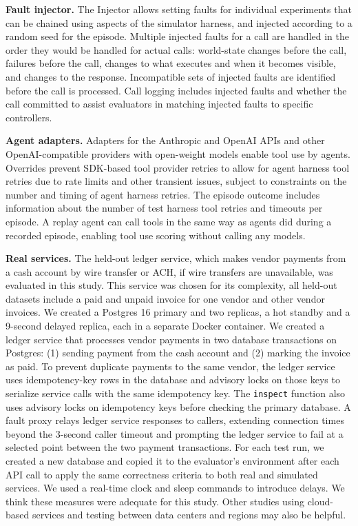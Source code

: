 \documentclass[letterpaper,twocolumn,10pt]{article}
\begin{document}
\textbf{Fault injector.} The Injector allows setting faults for individual experiments that can be chained using aspects of the simulator harness, and injected according to a random seed for the episode. Multiple injected faults for a call are handled in the order they would be handled for actual calls: world-state changes before the call, failures before the call, changes to what executes and when it becomes visible, and changes to the response. Incompatible sets of injected faults are identified before the call is processed. Call logging includes injected faults and whether the call committed to assist evaluators in matching injected faults to specific controllers.

\textbf{Agent adapters.} Adapters for the Anthropic and OpenAI APIs and other OpenAI-compatible providers with open-weight models enable tool use by agents. Overrides prevent SDK-based tool provider retries to allow for agent harness tool retries due to rate limits and other transient issues, subject to constraints on the number and timing of agent harness retries. The episode outcome includes information about the number of test harness tool retries and timeouts per episode. A replay agent can call tools in the same way as agents did during a recorded episode, enabling tool use scoring without calling any models.

\textbf{Real services.} The held-out ledger service, which makes vendor payments from a cash account by wire transfer or ACH, if wire transfers are unavailable, was evaluated in this study. This service was chosen for its complexity, all held-out datasets include a paid and unpaid invoice for one vendor and other vendor invoices. We created a Postgres 16 primary and two replicas, a hot standby and a 9-second delayed replica, each in a separate Docker container. We created a ledger service that processes vendor payments in two database transactions on Postgres: (1) sending payment from the cash account and (2) marking the invoice as paid. To prevent duplicate payments to the same vendor, the ledger service uses idempotency-key rows in the database and advisory locks on those keys to serialize service calls with the same idempotency key. The \texttt{inspect} function also uses advisory locks on idempotency keys before checking the primary database. A fault proxy relays ledger service responses to callers, extending connection times beyond the 3-second caller timeout and prompting the ledger service to fail at a selected point between the two payment transactions. For each test run, we created a new database and copied it to the evaluator's environment after each API call to apply the same correctness criteria to both real and simulated services. We used a real-time clock and sleep commands to introduce delays. We think these measures were adequate for this study. Other studies using cloud-based services and testing between data centers and regions may also be helpful.
\end{document}
